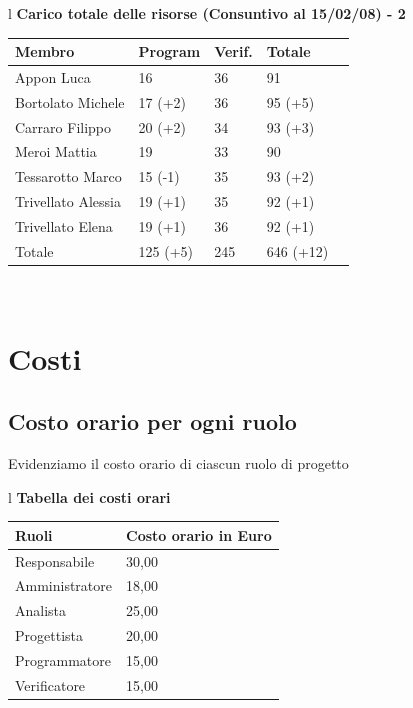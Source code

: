 \documentclass[11pt,titlepage,a4paper]{report}
\begin{document}
\begin{table}[hbtp]
\large{
\begin{tabular}{l}
\Large{\textbf{\textsf{Carico totale delle risorse (Consuntivo al 15/02/08) - 2}}} \\

\begin{tabular}{||p{3.5cm}||p{2cm}||p{2cm}||p{2cm}||p{2cm}||}
\hline
\textbf{Membro} & \textbf{Program} & \textbf{Verif.} & \textbf{Totale}\\
\hline
{Appon Luca}&16&36&91 \\ 
\hline 
{Bortolato Michele} &17 \footnotesize{(+2)}&36&95 \footnotesize{(+5)}\\ 
\hline
{Carraro Filippo}&20 \footnotesize{(+2)}&34&93 \footnotesize{(+3)} \\
\hline
{Meroi Mattia}&19&33&90\\
\hline
{Tessarotto Marco} &15 \footnotesize{(-1)}&35&93 \footnotesize{(+2)}\\
\hline
{Trivellato Alessia} &19 \footnotesize{(+1)}&35&92 \footnotesize{(+1)} \\
\hline
{Trivellato Elena} &19 \footnotesize{(+1)}&36&92 \footnotesize{(+1)} \\
\hline
{Totale} &125 \footnotesize{(+5)}&245&646 \footnotesize{(+12)} \\
\hline

\end{tabular} \\
\end{tabular}
}
\end{table}


\chapter{Costi}
\section{Costo orario per ogni ruolo}
Evidenziamo il costo orario di ciascun ruolo di progetto
\begin{table}[hbtp]
\large{
\begin{tabular}{l}
\Large{\textbf{\textsf{Tabella dei costi orari}}} \\

\begin{tabular}{||p{6cm}||p{5cm}||}
\hline
\textbf{Ruoli} & \textbf{Costo orario in Euro}\\
\hline
{Responsabile}&30,00\\ 
\hline 
{Amministratore} &18,00\\ 
\hline
{Analista} &25,00 \\
\hline
{Progettista} &20,00 \\
\hline
{Programmatore} &15,00\\
\hline
{Verificatore} &15,00 \\
\hline

\end{tabular} \\
\end{tabular}
}
\end{table}
\end{document}
